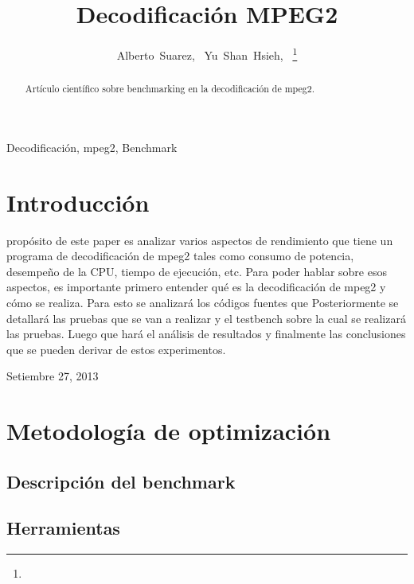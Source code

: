 \documentclass[journal]{IEEEtran}
\begin{document}
%
\title{Decodificaci\'{o}n MPEG2}
\author{Alberto~Suarez,~
        Yu~Shan~Hsieh,~%
\thanks{}%
}
\maketitle

\begin{abstract}
Art\'{i}culo cient\'{i}fico sobre benchmarking en la decodificaci\'{o}n de mpeg2.
\end{abstract}

\begin{IEEEkeywords}
Decodificaci\'{o}n, mpeg2, Benchmark
\end{IEEEkeywords}

\section{Introducci\'{o}n}
 prop\'{o}sito de este paper es analizar varios aspectos de rendimiento que tiene un programa de decodificaci\'{o}n de mpeg2 tales como consumo de potencia, desempeño de la CPU, tiempo de ejecuci\'{o}n, etc. 
Para poder hablar sobre esos aspectos, es importante primero entender qu\'{e} es la decodificaci\'{o}n de mpeg2 y c\'{o}mo se realiza. Para esto se analizar\'{a} los c\'{o}digos fuentes que  Posteriormente se detallar\'{a} las pruebas que se van a realizar y el testbench sobre la cual se realizar\'{a} las pruebas. Luego que har\'{a} el an\'{a}lisis de resultados y finalmente las conclusiones que se pueden derivar de estos experimentos.


\hfill Setiembre 27, 2013

\section{Metodolog\'{i}a de optimizaci\'{o}n}

\subsection{Descripci\'{o}n del benchmark}

\subsection{Herramientas}
\end{document}
